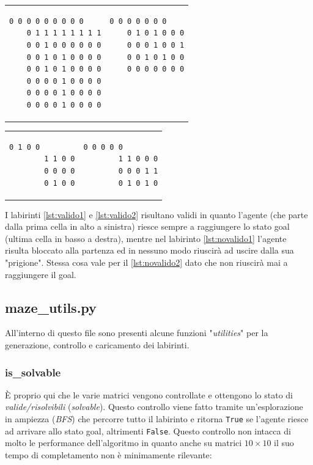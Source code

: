 \begin{tabular}{m{20em}  m{20em}}
\begin{lstlisting}[style=python, caption={Labirinto 8x9 valido}, label={lst:valido1}]
	0 0 0 0 0 0 0 0 0
	0 1 1 1 1 1 1 1 1
	0 0 1 0 0 0 0 0 0
	0 0 1 0 1 0 0 0 0
	0 0 1 0 1 0 0 0 0
	0 0 0 0 1 0 0 0 0
	0 0 0 0 1 0 0 0 0
	0 0 0 0 1 0 0 0 0
\end{lstlisting}
&
\begin{lstlisting}[style=python, caption={Labirinto 5x7 valido}, label={lst:valido2}]
	0 0 0 0 0 0 0
	0 1 0 1 0 0 0
	0 0 0 1 0 0 1
	0 0 1 0 1 0 0
	0 0 0 0 0 0 0
	
	
	
\end{lstlisting}
\end{tabular}

\begin{tabular}{m{20em}  m{20em}}
	\begin{lstlisting}[style=python, caption={Labirinto 4x4 NON valido}, label={lst:novalido1}]
		0 1 0 0
		1 1 0 0
		0 0 0 0
		0 1 0 0
	\end{lstlisting}
	&
	\begin{lstlisting}[style=python, caption={Labirinto 4x5 NON valido}, label={lst:novalido2}]
		0 0 0 0 0
		1 1 0 0 0
		0 0 0 1 1
		0 1 0 1 0
	\end{lstlisting}
\end{tabular}

I labirinti \ref{lst:valido1} e \ref{lst:valido2} risultano validi in quanto l'agente (che parte dalla prima cella in alto a sinistra) riesce sempre a raggiungere lo stato goal (ultima cella in basso a destra), mentre nel labirinto \ref{lst:novalido1} l'agente risulta bloccato alla partenza ed in nessuno modo riuscir\`{a} ad uscire dalla sua "prigione". Stessa cosa vale per il \ref{lst:novalido2} dato che non riuscir\`{a} mai a raggiungere il goal.

\subsection{maze\_utils.py}
All'interno di questo file sono presenti alcune funzioni "\textit{utilities}" per la generazione, controllo e caricamento dei labirinti. 

\subsubsection{is\_solvable}
\`{E} proprio qui che le varie matrici vengono controllate e ottengono lo stato di \textit{valide/risolvibili} (\textit{solvable}). 
Questo controllo viene fatto tramite un'esplorazione in ampiezza (\textit{BFS}) che percorre tutto il labirinto e ritorna \lstinline[style=cmd]|True| se l'agente riesce ad arrivare allo stato goal, altrimenti \lstinline[style=cmd]|False|. Questo controllo non intacca di molto le performance dell'algoritmo in quanto anche su matrici $10 \times 10$ il suo tempo di completamento non \`{e} minimamente rilevante: 

